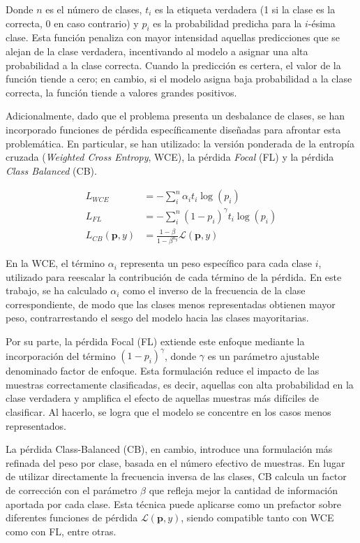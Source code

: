 Donde $n$ es el número de clases, $t_i$ es la etiqueta verdadera (1 si la clase es la correcta, 0 en caso contrario) y $p_i$ es la probabilidad predicha para la $i$-ésima clase. Esta función penaliza con mayor intensidad aquellas predicciones que se alejan de la clase verdadera, incentivando al modelo a asignar una alta probabilidad a la clase correcta. Cuando la predicción es certera, el valor de la función tiende a cero; en cambio, si el modelo asigna baja probabilidad a la clase correcta, la función tiende a valores grandes positivos.

Adicionalmente, dado que el problema presenta un desbalance de clases, se han incorporado funciones de pérdida específicamente diseñadas para afrontar esta problemática. En particular, se han utilizado: la versión ponderada de la entropía cruzada (\textit{Weighted Cross Entropy}, WCE), la pérdida \textit{Focal} (FL) y la pérdida \textit{Class Balanced} (CB).

\begin{align}
    L_{WCE} &= -\sum_i^n \alpha_{i} t_i \log(p_i) \\
    L_{FL} &= -\sum_i^n (1-p_i)^{\gamma} t_i \log(p_i) \\
    L_{CB}(\textbf{p},y) &= \frac{1-\beta}{1-\beta^{n_{y}}} \mathcal{L}(\textbf{p},y)
\end{align}

En la WCE, el término $\alpha_i$ representa un peso específico para cada clase $i$, utilizado para reescalar la contribución de cada término de la pérdida. En este trabajo, se ha calculado $\alpha_i$ como el inverso de la frecuencia de la clase correspondiente, de modo que las clases menos representadas obtienen mayor peso, contrarrestando el sesgo del modelo hacia las clases mayoritarias.

Por su parte, la pérdida Focal (FL) extiende este enfoque mediante la incorporación del término $(1 - p_i)^\gamma$, donde $\gamma$ es un parámetro ajustable denominado factor de enfoque. Esta formulación reduce el impacto de las muestras correctamente clasificadas, es decir, aquellas con alta probabilidad en la clase verdadera y amplifica el efecto de aquellas muestras más difíciles de clasificar. Al hacerlo, se logra que el modelo se concentre en los casos menos representados.

La pérdida Class-Balanced (CB), en cambio, introduce una formulación más refinada del peso por clase, basada en el número efectivo de muestras. En lugar de utilizar directamente la frecuencia inversa de las clases, CB calcula un factor de corrección con el parámetro $\beta$ que refleja mejor la cantidad de información aportada por cada clase. Esta técnica puede aplicarse como un prefactor sobre diferentes funciones de pérdida $\mathcal{L}(\mathbf{p}, y)$, siendo compatible tanto con WCE como con FL, entre otras.

